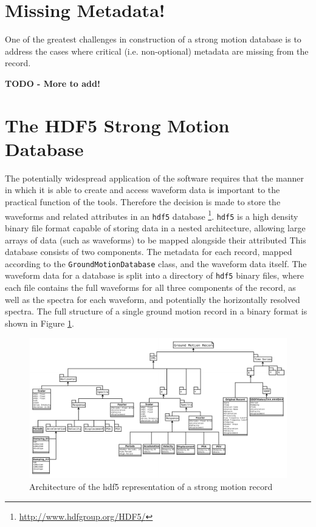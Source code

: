 \section{Missing Metadata!}
\label{sec:missing_metadata}

One of the greatest challenges in construction of a strong motion database is to address the cases where critical (i.e. non-optional) metadata are missing from the record. 

\textbf{TODO - More to add!}

\section{The HDF5 Strong Motion Database}
\label{sec:hdf5}

The potentially widespread application of the software requires that the manner in which it is able to create and access waveform data is important to the practical function of the tools. Therefore the decision is made to store the waveforms and related attributes in an \verb=hdf5= database \footnote{\href{http://www.hdfgroup.org/HDF5/}{http://www.hdfgroup.org/HDF5/}}. \verb=hdf5= is a high density binary file format capable of storing data in a nested architecture, allowing large arrays of data (such as waveforms) to be mapped alongside their attributed This database consists of two components. The metadata for each record, mapped according to the \verb=GroundMotionDatabase= class, and the waveform data itself. The waveform data for a database is split into a directory of \verb=hdf5= 
binary files, where each file contains the full waveforms for all three components of the record, as well as the spectra for each waveform, and potentially the horizontally resolved spectra. The full structure of a single ground motion record in a binary format is shown in Figure \ref{fig:sm_hdf5_model}.

\begin{figure}
	\centering
		\includegraphics[width=\textwidth]{./figures/database/sm_database_architecture.pdf}
	\caption{Architecture of the hdf5 representation of a strong motion record}
	\label{fig:sm_hdf5_model}
\end{figure}

